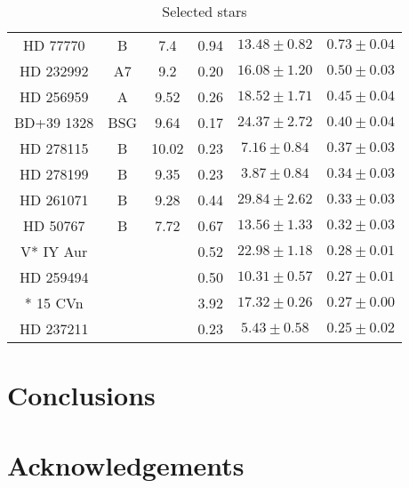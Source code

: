 \documentclass[fleqn,usenatbib]{mnras}
\begin{document}
\begin{table}
\begin{center}
\begin{tabular}{c c c c c c}
HD 77770 &B	&7.4& 0.94 & $13.48\pm 0.82$& $0.73 \pm 0.04$\\
HD 232992 &A7&9.2& 0.20 & $16.08\pm 1.20$& $0.50\pm 0.03$\\
HD 256959 &A&9.52& 0.26 & $18.52\pm 1.71$& $0.45 \pm 0.04$\\
BD+39 1328&BSG&9.64 &  0.17 & $24.37  \pm    2.72$ & $0.40 \pm 0.04$\\
HD 278115&B	&10.02&  0.23 &  $7.16  \pm    0.84$ & $0.37 \pm 0.03$\\
HD 278199&B	&9.35&  0.23 &  $3.87   \pm   0.84$ & $ 0.34 \pm 0.03$\\
HD 261071&B	&9.28 &  0.44 & $29.84  \pm    2.62$ & $0.33  \pm 0.03$\\
HD  50767&B	&7.72 &  0.67 & $13.56  \pm    1.33$ & $0.32 \pm 0.03$\\
V* IY Aur &&   &  0.52 & $22.98 \pm     1.18$ & $0.28  \pm 0.01$\\
HD 259494 &&   &  0.50 & $10.31   \pm   0.57$ & $0.27 \pm 0.01$\\
*  15 CVn  &&  &  3.92 & $17.32  \pm    0.26$ & $0.27 \pm 0.00$\\
HD 237211  &&  &  0.23 &  $5.43 \pm     0.58$ & $0.25 \pm 0.02$\\

\hline
\end{tabular}
\caption{Selected stars}
 \label{tab:significance}
\end{center}
\end{table}
\section{Conclusions}



\section*{Acknowledgements}











\appendix



\bsp	%
\label{lastpage}
\end{document}
